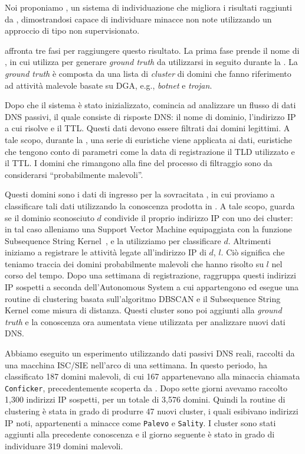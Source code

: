 Noi proponiamo \thesystem, un sistema di individuazione che migliora i risultati
raggiunti da \phoenix, dimostrandosi capace di individuare minacce non note
utilizzando un approccio di tipo non supervisionato.

\thesystem affronta tre fasi per raggiungere questo risultato. La prima fase
prende il nome di , in cui utilizza \phoenix
per generare \emph{ground truth} da utilizzarsi in seguito durante la
. La \emph{ground truth} è composta da una lista di
\emph{cluster} di domini che fanno riferimento ad attività malevole basate su DGA,
e.g., \emph{botnet} e \emph{trojan}.

Dopo che il sistema è stato inizializzato, comincia ad analizzare
un flusso di dati DNS passivi, il quale consiste di risposte DNS: il nome di dominio,
l'indirizzo IP a cui risolve e il TTL. Questi dati devono essere filtrati dai domini
legittimi. A tale scopo, durante la , una serie di
euristiche viene applicata ai dati, euristiche che tengono conto di parametri come
la data di registrazione il TLD utilizzato e il TTL. I domini che rimangono alla
fine del processo di filtraggio sono da considerarsi ``probabilmente malevoli''.

Questi domini sono i dati di ingresso per la sovracitata , in cui proviamo a classificare tali dati utilizzando la conoscenza prodotta in
. A tale scopo, \thesystem guarda se il dominio
sconosciuto $d$ condivide il proprio indirizzo IP con uno dei cluster: in tal caso
alleniamo una Support Vector Machine equipaggiata con la funzione
Subsequence String Kernel~\cite{lodhi2002}, e la utilizziamo per classificare $d$.
Altrimenti iniziamo a registrare le attività legate all'indirizzo IP di $d$, $l$.
Ciò significa che teniamo traccia dei domini probabilmente malevoli che hanno
risolto su $l$ nel corso del tempo. Dopo una settimana di registrazione, \thesystem
raggruppa questi indirizzi IP sospetti a seconda dell'Autonomous System a cui
appartengono ed esegue una routine di clustering basata sull'algoritmo DBSCAN e
il Subsequence String Kernel come misura di distanza. Questi cluster sono poi
aggiunti alla \emph{ground truth} e la conoscenza ora aumentata viene utilizzata
per analizzare nuovi dati DNS.

Abbiamo eseguito un esperimento utilizzando dati passivi DNS reali,
raccolti da una macchina ISC/SIE nell'arco di una settimana. In questo periodo, \thesystem ha
classificato 187 domini malevoli, di cui 167 appartenevano alla minaccia chiamata
\texttt{Conficker}, precedentemente scoperta da \phoenix. Dopo sette giorni
avevamo raccolto 1,300 indirizzi IP sospetti, per un totale di 3,576 domini.
Quindi la routine di clustering è stata in grado di produrre 47 nuovi cluster,
i quali esibivano indirizzi IP noti, appartenenti a minacce come \texttt{Palevo}
e \texttt{Sality}. I cluster sono stati aggiunti alla precedente conoscenza e il
giorno seguente \thesystem è stato in grado di individuare 319 domini
malevoli.

